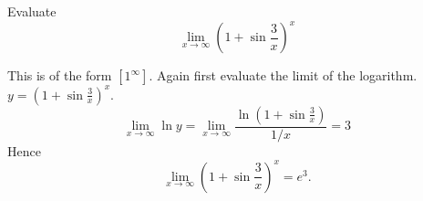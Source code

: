 \documentclass[../calc1-main.tex]{subfiles}
\begin{document}
\begin{example}
  Evaluate
  \[
    \lim_{x \to \infty} \left( 1+ \sin \frac{3}{x} \right)^x
  \]
\end{example}
\begin{example}
  This is of the form $[1^{\infty}]$. Again first evaluate the limit of the logarithm. $y=\left( 1+ \sin \frac{3}{x} \right)^x$.
  \[
    \lim_{x \to \infty} \ln y =
    \lim_{x \to \infty} \frac{\ln \left( 1+ \sin \frac{3}{x} \right)}{1/x} = 3
  \]
  Hence
  \[
    \lim_{x \to \infty} \left( 1+ \sin \frac{3}{x} \right)^x = e^3.
  \]
\end{example}
\end{document}
